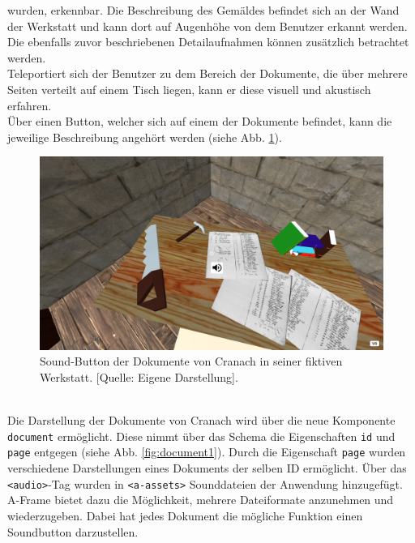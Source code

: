 \documentclass[a4paper,12pt,oneside]{article}
\begin{document}
        wurden, erkennbar. Die Beschreibung des
        Gemäldes befindet sich an der Wand der Werkstatt 
        und kann dort auf Augenhöhe von
        dem Benutzer erkannt werden. Die ebenfalls
        zuvor beschriebenen Detailaufnahmen können
        zusätzlich betrachtet werden. \\
        Teleportiert sich der Benutzer zu dem Bereich der Dokumente, 
        die über mehrere Seiten verteilt auf einem Tisch liegen,
        kann er diese visuell und akustisch erfahren. \\
        Über einen Button, welcher
        sich auf einem der Dokumente befindet, kann die 
        jeweilige Beschreibung angehört werden
        (siehe Abb. \ref{fig:werkstatt3}).
        \begin{figure}
          \centering
          \includegraphics[scale=0.3]{img/coding/werkstatt3.png}
          \caption[Sound-Button der Dokumente von Cranach in seiner fiktiven Werkstatt.]{Sound-Button der Dokumente von Cranach in seiner fiktiven Werkstatt. [Quelle: Eigene Darstellung].}
          \label{fig:werkstatt3}
        \end{figure} \\
        Die Darstellung der Dokumente von Cranach wird über die
        neue Komponente \texttt{document} ermöglicht. Diese nimmt über das
        Schema die Eigenschaften \texttt{id} und \texttt{page} 
        entgegen (siehe Abb. \ref{fig:document1}).
        Durch die Eigenschaft \texttt{page} wurden verschiedene
        Darstellungen eines Dokuments der selben ID ermöglicht. Über das
        \texttt{<audio>}-Tag wurden in \texttt{<a-assets>} Sounddateien der
        Anwendung hinzugefügt. A-Frame bietet dazu die Möglichkeit, 
        mehrere Dateiformate anzunehmen und wiederzugeben. 
        Dabei hat jedes Dokument die mögliche Funktion
        einen Soundbutton darzustellen.
\end{document}
